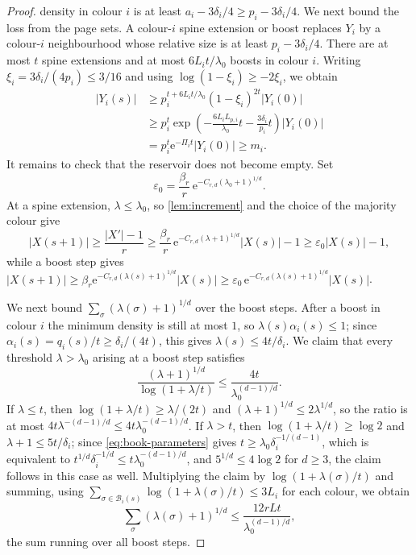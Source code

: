 \documentclass[11pt]{article}
\theoremstyle{definition}
\newcommand{\e}{\mathrm e}
\begin{document}
\begin{proof}
density in colour $i$ is at least $a_i-3\delta_i/4\ge p_i-3\delta_i/4$.
We next bound the loss from the page sets.  A colour-$i$ spine extension or
boost replaces $Y_i$ by a colour-$i$ neighbourhood whose relative size is at
least $p_i-3\delta_i/4$.  There are at most $t$ spine extensions and at most
$6L_it/\lambda_0$ boosts in colour $i$.
Writing $\xi_i=3\delta_i/(4p_i)\le3/16$ and using
$\log(1-\xi_i)\ge-2\xi_i$, we obtain
\begin{align*}
 |Y_i(s)|
 &\ge p_i^{t+6L_it/\lambda_0}(1-\xi_i)^{2t}|Y_i(0)|\\
 &\ge p_i^t
 \exp\!\left(-\frac{6L_iL_{p,i}}{\lambda_0}t
              -\frac{3\delta_i}{p_i}t\right)|Y_i(0)|\\
 &=p_i^t\e^{-\Pi_it}|Y_i(0)|\ge m_i.
\end{align*}
It remains to check that the reservoir does not become empty.  Set
\[
 \varepsilon_0=\frac{\beta_r}{r}\,\e^{-C_{r,d}(\lambda_0+1)^{1/d}}.
\]
At a spine extension, $\lambda\le\lambda_0$, so \cref{lem:increment} and the
choice of the majority colour give
\[
 |X(s+1)|\ge\frac{|X'|-1}{r}
 \ge\frac{\beta_r}{r}\,\e^{-C_{r,d}(\lambda+1)^{1/d}}|X(s)|-1
 \ge\varepsilon_0|X(s)|-1,
\]
while a boost step gives
$|X(s+1)|\ge\beta_r\e^{-C_{r,d}(\lambda(s)+1)^{1/d}}|X(s)|
\ge\varepsilon_0\,\e^{-C_{r,d}(\lambda(s)+1)^{1/d}}|X(s)|$.

We next bound $\sum_\sigma(\lambda(\sigma)+1)^{1/d}$ over the boost steps.
After a boost in colour
$i$ the minimum density is still at most $1$, so
$\lambda(s)\alpha_i(s)\le1$; since $\alpha_i(s)=q_i(s)/t\ge\delta_i/(4t)$,
this gives $\lambda(s)\le4t/\delta_i$.  We claim that every threshold
$\lambda>\lambda_0$ arising at a boost step satisfies
\[
 \frac{(\lambda+1)^{1/d}}{\log(1+\lambda/t)}
 \le\frac{4t}{\lambda_0^{(d-1)/d}}.
\]
If $\lambda\le t$, then $\log(1+\lambda/t)\ge\lambda/(2t)$ and
$(\lambda+1)^{1/d}\le2\lambda^{1/d}$, so the ratio is at most
$4t\lambda^{-(d-1)/d}\le4t\lambda_0^{-(d-1)/d}$.  If $\lambda>t$, then
$\log(1+\lambda/t)\ge\log2$ and $\lambda+1\le5t/\delta_i$; since
\eqref{eq:book-parameters} gives $t\ge\lambda_0\delta_i^{-1/(d-1)}$, which
is equivalent to $t^{1/d}\delta_i^{-1/d}\le t\lambda_0^{-(d-1)/d}$, and
$5^{1/d}\le4\log2$ for $d\ge3$, the claim follows in this case as well.
Multiplying the claim by $\log(1+\lambda(\sigma)/t)$ and summing, using
$\sum_{\sigma\in\mathcal B_i(s)}\log(1+\lambda(\sigma)/t)\le3L_i$ for each
colour, we obtain
\[
 \sum_{\sigma}(\lambda(\sigma)+1)^{1/d}
 \le\frac{12rLt}{\lambda_0^{(d-1)/d}},
\]
the sum running over all boost steps.


\end{proof}
\end{document}
